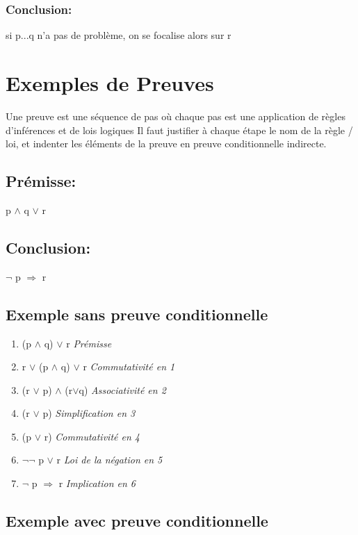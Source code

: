 \subsection{Conclusion:}

si p...q n'a pas de problème, on se focalise alors sur r
 

\chapter{Exemples de Preuves}

Une preuve est une séquence de pas où chaque pas est une application de règles d'inférences et de lois logiques
Il faut justifier à chaque étape le nom de la règle / loi, et indenter les éléments de la preuve en preuve conditionnelle indirecte.

\section{Prémisse:} 

p $\land$ q $\lor$ r

\section{Conclusion:}

$\lnot$ p $\Rightarrow$ r

\section{Exemple sans preuve conditionnelle}

\begin{enumerate}
\item   (p $\land$ q) $\lor$ r  \textit{Prémisse}
\item   r $\lor$ (p $\land$ q)  $\lor$ r \textit{Commutativité en 1}
\item   (r $\lor$ p) $\land$ (r$\lor$q) \textit{Associativité en 2}
\item   (r $\lor$ p) \textit{Simplification en 3}
\item   (p $\lor$ r) \textit{Commutativité en 4}
\item   $\lnot$$\lnot$ p $\lor$ r \textit{Loi de la négation en 5}
\item   $\lnot$ p $\Rightarrow$ r \textit{Implication en 6}
\end{enumerate}

\section{Exemple avec preuve conditionnelle}

